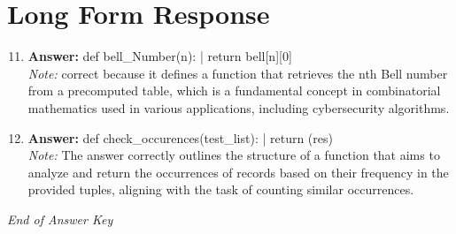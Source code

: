 \documentclass[12pt]{article}
\begin{document}
\section*{Long Form Response}
\begin{enumerate}[label=\arabic*.]
\setcounter{enumi}{10}
\item \textbf{Answer:} def bell\_Number(n): | return bell[n][0]
\\ \textit{Note:} correct because it defines a function that retrieves the nth Bell number from a precomputed table, which is a fundamental concept in combinatorial mathematics used in various applications, including cybersecurity algorithms.
\item \textbf{Answer:} def check\_occurences(test\_list): | return (res)
\\ \textit{Note:} The answer correctly outlines the structure of a function that aims to analyze and return the occurrences of records based on their frequency in the provided tuples, aligning with the task of counting similar occurrences.
\end{enumerate}

\vfill
\noindent\textit{End of Answer Key}
\end{document}
